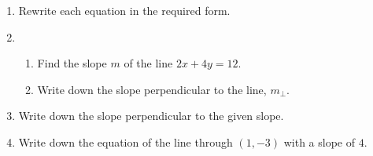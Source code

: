 \documentclass[12pt, twoside]{article}
\begin{document}
\begin{enumerate}
\item Rewrite each equation in the required form.
  \begin{enumerate}
  \end{enumerate} \vspace{0.5cm}

\newpage
\item   
 \begin{enumerate}
  \item Find the slope $m$ of the line $2x+4y=12$.
  \vspace{2cm}
  \item Write down the slope perpendicular to the line, $m_{\perp}$.
  \vspace{0.5cm}
\end{enumerate}

\item Write down the slope perpendicular to the given slope.
\begin{enumerate}
\end{enumerate} \vspace{0.5cm}

\item Write down the equation of the line through $(1,-3)$ with a slope of $4$.
\vspace{2cm}


\end{enumerate}
\end{document}
